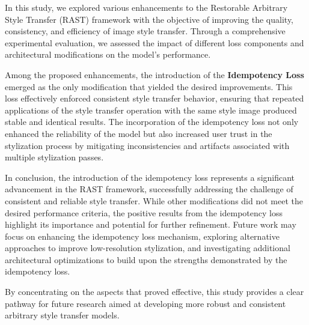 \documentclass{article}
\begin{document}
In this study, we explored various enhancements to the Restorable Arbitrary Style Transfer (RAST) framework with the objective of improving the quality, consistency, and efficiency of image style transfer. Through a comprehensive experimental evaluation, we assessed the impact of different loss components and architectural modifications on the model's performance.

Among the proposed enhancements, the introduction of the \textbf{Idempotency Loss} emerged as the only modification that yielded the desired improvements. This loss effectively enforced consistent style transfer behavior, ensuring that repeated applications of the style transfer operation with the same style image produced stable and identical results. The incorporation of the idempotency loss not only enhanced the reliability of the model but also increased user trust in the stylization process by mitigating inconsistencies and artifacts associated with multiple stylization passes.

In conclusion, the introduction of the idempotency loss represents a significant advancement in the RAST framework, successfully addressing the challenge of consistent and reliable style transfer. While other modifications did not meet the desired performance criteria, the positive results from the idempotency loss highlight its importance and potential for further refinement. Future work may focus on enhancing the idempotency loss mechanism, exploring alternative approaches to improve low-resolution stylization, and investigating additional architectural optimizations to build upon the strengths demonstrated by the idempotency loss.

By concentrating on the aspects that proved effective, this study provides a clear pathway for future research aimed at developing more robust and consistent arbitrary style transfer models.



\end{document}

